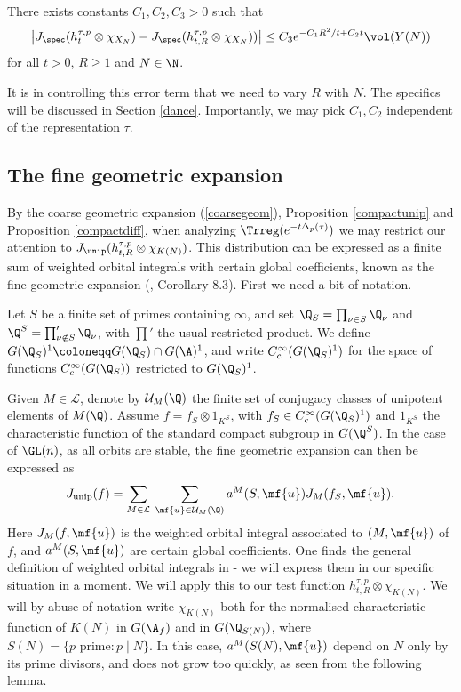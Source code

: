 \begin{prop}\label{compactdiff}
    There exists constants $C_1,C_2,C_3>0$ such that
    \begin{align*}
        \big\vert J_{\spec}(h_t^{\tau,p}\otimes\chi_{{X_N}})-J_{\spec}(h_{t,R}^{\tau,p}\otimes\chi_{{X_N}}))\big\vert\leq C_3 e^{-C_1 R^2/t+C_2t}\vol(Y(N))
    \end{align*}
    for all $t>0$, $R\geq 1$ and $N\in\N$.
\end{prop}

\noindent It is in controlling this error term that we need to vary $R$ with $N$. The specifics will be discussed in Section \ref{dance}. Importantly, we may pick $C_1,C_2$ independent of the representation $\tau$. 




\subsection{The fine geometric expansion}

By the coarse geometric expansion (\ref{coarsegeom}), Proposition \ref{compactunip} and Proposition \ref{compactdiff}, when analyzing $\Trreg(e^{-t\Delta_p(\tau)})$ we may restrict our attention to $J_{\unip}(h^{\tau,p}_{t,R}\otimes\chi_{K(N)})$. This distribution can be expressed as a finite sum of weighted orbital integrals with certain global coefficients, known as the fine geometric expansion (\cite{Arthur4}, Corollary $8.3$). First we need a bit of notation.

Let $S$ be a finite set of primes containing $\infty$, and set $\Q_S=\prod_{\nu\in S}\Q_\nu$ and $\Q^S=\prod_{\nu\notin S}'\Q_\nu$, with $\prod'$ the usual restricted product. We define $G(\Q_S)^1 \coloneqq G(\Q_S)\cap G(\A)^1$, and write $C_c^\infty(G(\Q_S)^1)$ for the space of functions $C_c^\infty(G(\Q_S))$ restricted to $G(\Q_S)^1$.

Given $M\in \mathcal{L}$, denote by $\mathcal{U}_M(\Q)$ the finite set of conjugacy classes of unipotent elements of $M(\Q)$. Assume $f=f_S\otimes 1_{K^S}$, with $f_S\in C_c^\infty(G(\Q_S)^1)$ and $1_{K^S}$ the characteristic function of the standard compact subgroup in $G(\Q^S)$.
In the case of $\GL(n)$, as all orbits are stable, the fine geometric expansion can then be expressed as 
\begin{align}\label{finegeom}
    J_{\text{unip}}(f) = \sum_{M\in\mathcal{L}}\:\sum_{\mf{u}\in \mathcal{U}_M(\Q)}a^M(S,\mf{u})J_M(f_S,\mf{u}).
\end{align}
Here $J_M(f,\mf{u})$ is the weighted orbital integral associated to $(M,\mf{u})$ of $f$, and $a^M(S,\mf{u})$ are certain global coefficients. One finds the general definition of weighted orbital integrals in \cite{Arthur1} - we will express them in our specific situation in a moment. We will apply this to our test function $h^{\tau,p}_{t,R}\otimes \chi_{K(N)}$. We will by abuse of notation write $\chi_{K(N)}$ both for the normalised characteristic function of $K(N)$ in $G(\A_f)$ and in $G(\Q_{S(N)})$, where $S(N)=\lbrace p\text{ prime} : p\mid N\rbrace$. In this case, $a^M(S(N),\mf{u})$ depend on $N$ only by its prime divisors, and does not grow too quickly, as seen from the following lemma.

